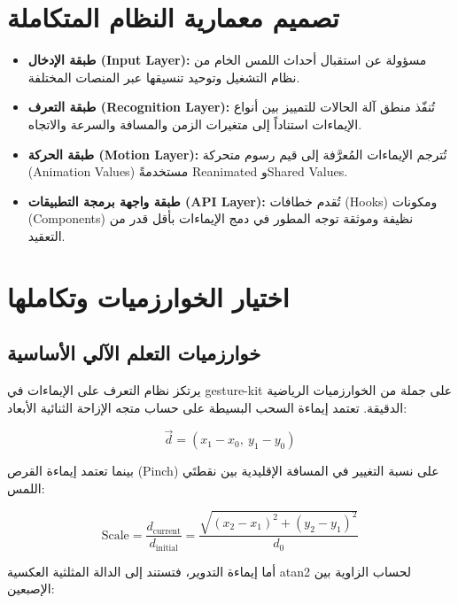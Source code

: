 \begin{Arabic}
\section{تصميم معمارية النظام المتكاملة}

\begin{itemize}
    \item \textbf{طبقة الإدخال (\textenglish{Input Layer}):} مسؤولة عن استقبال أحداث اللمس الخام من نظام التشغيل وتوحيد تنسيقها عبر المنصات المختلفة.
    \item \textbf{طبقة التعرف (\textenglish{Recognition Layer}):} تُنفّذ منطق آلة الحالات للتمييز بين أنواع الإيماءات استناداً إلى متغيرات الزمن والمسافة والسرعة والاتجاه.
    \item \textbf{طبقة الحركة (\textenglish{Motion Layer}):} تُترجم الإيماءات المُعرَّفة إلى قيم رسوم متحركة (\textenglish{Animation Values}) مستخدمةً \textenglish{Reanimated} و\textenglish{Shared Values}.
    \item \textbf{طبقة واجهة برمجة التطبيقات (\textenglish{API Layer}):} تُقدم خطافات (\textenglish{Hooks}) ومكونات (\textenglish{Components}) نظيفة وموثقة توجه المطور في دمج الإيماءات بأقل قدر من التعقيد.
\end{itemize}

\section{اختيار الخوارزميات وتكاملها}

\subsection{خوارزميات التعلم الآلي الأساسية}

يرتكز نظام التعرف على الإيماءات في \textenglish{gesture-kit} على جملة من الخوارزميات الرياضية الدقيقة. تعتمد إيماءة السحب البسيطة على حساب متجه الإزاحة الثنائية الأبعاد:

\begin{equation}
\vec{d} = (x_1 - x_0,\ y_1 - y_0)
\end{equation}

بينما تعتمد إيماءة القرص (\textenglish{Pinch}) على نسبة التغيير في المسافة الإقليدية بين نقطتَي اللمس:

\begin{equation}
\text{Scale} = \frac{d_{\text{current}}}{d_{\text{initial}}} = \frac{\sqrt{(x_2-x_1)^2 + (y_2-y_1)^2}}{d_0}
\end{equation}

أما إيماءة التدوير، فتستند إلى الدالة المثلثية العكسية \textenglish{atan2} لحساب الزاوية بين الإصبعين:


\end{Arabic}
